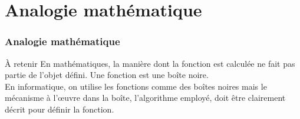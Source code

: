 \documentclass[xcolor=pdftex,svgnames,table]{beamer}
\begin{document}
\section{Analogie mathématique}
 \begin{frame}
   \frametitle{Analogie mathématique \nowrite}


\begin{block}{À retenir} 
  En mathématiques, la manière dont la fonction est calculée ne fait
  pas partie de l'objet défini. Une fonction est une boîte noire.\\ 
  \pause En
  informatique, on utilise les fonctions comme des boîtes noires mais
  le mécanisme à l'œuvre dans la boîte, l'algorithme employé, doit
  être clairement décrit pour définir la fonction.
\end{block}

\end{frame}
\end{document}
